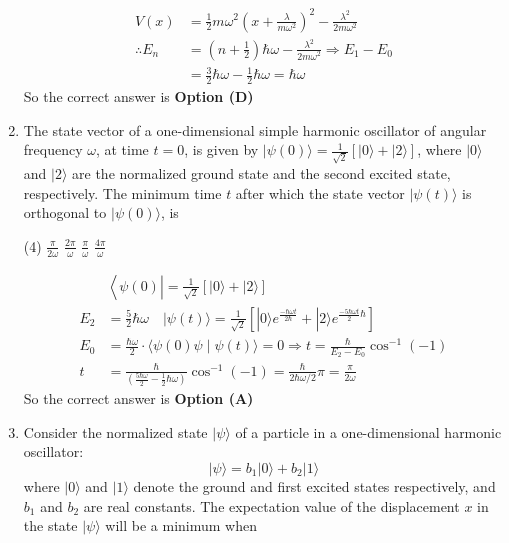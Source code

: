 \begin{enumerate}
\begin{answer}
\begin{align*}
V(x)&=\frac{1}{2} m \omega^{2}\left(x+\frac{\lambda}{m \omega^{2}}\right)^{2}-\frac{\lambda^{2}}{2 m \omega^{2}}\\
\therefore E_{n}&=\left(n+\frac{1}{2}\right) \hbar \omega-\frac{\lambda^{2}}{2 m \omega^{2}} \Rightarrow E_{1}-E_{0}\\&=\frac{3}{2} \hbar \omega-\frac{1}{2} \hbar \omega=\hbar \omega
\end{align*}
So the correct answer is \textbf{Option (D)}
\end{answer}
	\item The state vector of a one-dimensional simple harmonic oscillator of angular frequency $\omega$, at time $t=0$, is given by $|\psi(0)\rangle=\frac{1}{\sqrt{2}}[|0\rangle+|2\rangle]$, where $|0\rangle$ and $|2\rangle$ are the normalized ground state and the second excited state, respectively. The minimum time $t$ after which the state vector $|\psi(t)\rangle$ is orthogonal to $|\psi(0)\rangle$, is
{	}
\begin{tasks}(4)
\task[\textbf{A.}] $\frac{\pi}{2 \omega}$ 
\task[\textbf{B.}] $\frac{2 \pi}{\omega}$
\task[\textbf{C.}] $\frac{\pi}{\omega}$
\task[\textbf{D.}] $\frac{4 \pi}{\omega}$
\end{tasks}
\begin{answer}
\begin{align*}
&\left\langle\psi(0)\left|=\frac{1}{\sqrt{2}}[|0\rangle+|2\rangle]\right.\right.\\
E_{2}&=\frac{5}{2} \hbar \omega \quad|\psi(t)\rangle=\frac{1}{\sqrt{2}}\left[|0\rangle e^{\frac{-\hbar \omega t}{2 \hbar}}+|2\rangle e^{\frac{-5 \hbar \omega t}{2} \hbar}\right]\\
E_{0}&=\frac{\hbar \omega}{2} \cdot\langle\psi(0) \psi \mid \psi(t)\rangle=0 \Rightarrow t=\frac{\hbar}{E_{2}-E_{0}} \cos ^{-1}(-1)\\
t&=\frac{\hbar}{\left(\frac{5 \hbar \omega}{2}-\frac{1}{2} \hbar \omega\right)} \cos ^{-1}(-1)=\frac{\hbar}{2 \hbar \omega / 2} \pi=\frac{\pi}{2 \omega}
\end{align*}
So the correct answer is \textbf{Option (A)}
\end{answer}
	\item Consider the normalized state $|\psi\rangle$ of a particle in a one-dimensional harmonic oscillator:
	$$
	|\psi\rangle=b_{1}|0\rangle+b_{2}|1\rangle
	$$
	where $|0\rangle$ and $|1\rangle$ denote the ground and first excited states respectively, and $b_{1}$ and $b_{2}$ are real constants. The expectation value of the displacement $x$ in the state $|\psi\rangle$ will be a minimum when

\end{enumerate}
